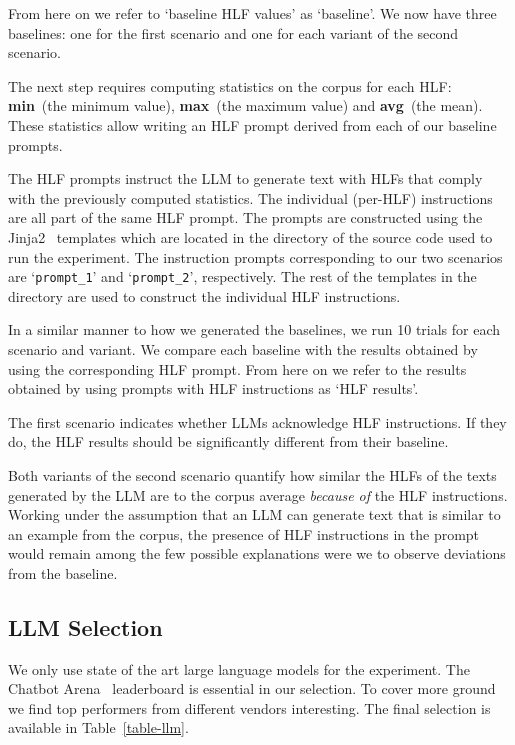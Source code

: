 \documentclass[11pt]{article}
\begin{document}
From here on we refer to `baseline HLF values' as `baseline'.
We now have three baselines: one for the first scenario and one for each variant
of the second scenario.

The next step requires computing statistics on the corpus for each HLF:\@
\textbf{min}~(the minimum value), \textbf{max}~(the maximum value) and
\textbf{avg}~(the mean).
These statistics allow writing an HLF prompt derived from each of our baseline
prompts.

The HLF prompts instruct the LLM to generate text with HLFs that comply with the
previously computed statistics.
The individual (per-HLF) instructions are all part of the same HLF prompt.
The prompts are constructed using the Jinja2~\cite{jinja2} templates which are
located in the \texttt{}
directory of the source code used to run the experiment.
The instruction prompts corresponding to our two scenarios are
`\texttt{prompt\_1}' and `\texttt{prompt\_2}', respectively.
The rest of the templates in the directory are used to construct the individual
HLF instructions.

In a similar manner to how we generated the baselines, we run 10 trials for each
scenario and variant.
We compare each baseline with the results obtained by using the corresponding
HLF prompt.
From here on we refer to the results obtained by using prompts with HLF
instructions as `HLF results'.

The first scenario indicates whether LLMs acknowledge HLF instructions.
If they do, the HLF results should be significantly different from their
baseline.

Both variants of the second scenario quantify how similar the HLFs of the texts
generated by the LLM are to the corpus average \textit{because of} the HLF
instructions.
Working under the assumption that an LLM can generate text that is similar to an
example from the corpus, the presence of HLF instructions in the prompt would
remain among the few possible explanations were we to observe deviations from
the baseline.

\subsection{LLM Selection}\label{llm-selection}

We only use state of the art large language models for the experiment.
The Chatbot Arena~\cite{chiang2024chatbot} leaderboard is essential in our
selection.
To cover more ground we find top performers from different vendors interesting.
The final selection is available in Table~\ref{table-llm}.
\end{document}
